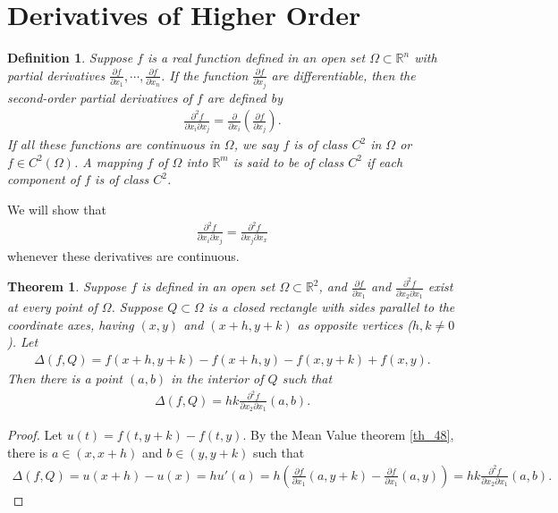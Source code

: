 \documentclass[11pt]{book}
\newtheorem{definition}{Definition}[chapter]
\newtheorem{theorem}{Theorem}[chapter]
\theoremstyle{definition}
\numberwithin{equation}{chapter}
\begin{document}
\medskip


\section{Derivatives of Higher Order}

\begin{definition}
Suppose $f$ is a real function defined in an open set $\Omega \subset \mathbb{R}^n$ with partial derivatives $\frac{\partial f}{\partial x_1}, \cdots, \frac{\partial f}{\partial x_n}$. If the function $\frac{\partial f}{\partial x_j}$ are differentiable, then  the second-order partial derivatives of $f$ are defined by
\begin{align*}
    \frac{\partial^2 f}{\partial x_i \partial x_j} = \frac{\partial}{\partial x_i} \left(\frac{\partial f}{\partial x_j}\right).
\end{align*}
If all these functions are continuous in $\Omega$, we say $f$ is of class $C^2$ in $\Omega$ or $f \in C^2(\Omega)$. A mapping $f$ of $\Omega$ into $\mathbb{R}^m$ is said to be of class $C^2$ if each component of $f$ is of class $C^2$.
\end{definition}

\medskip

We will show that
\begin{align*}
    \frac{\partial^2 f}{\partial x_i \partial x_j} = \frac{\partial^2 f}{\partial x_j \partial x_x}
\end{align*}
whenever these derivatives are continuous.

\medskip

\begin{theorem}\label{th_715}
Suppose $f$ is defined in an open set $\Omega \subset \mathbb{R}^2$, and $\frac{\partial f}{\partial x_1}$ and $\frac{\partial^2 f}{\partial x_2 \partial x_1}$ exist at every point of $\Omega$. Suppose $Q \subset \Omega$ is a closed rectangle with sides parallel to the coordinate axes, having $(x,y)$ and $(x+h,y+k)$ as opposite vertices ($h,k \neq 0$). Let
\begin{align*}
    \Delta (f,Q) = f(x+h,y+k) - f(x+h,y) - f(x,y+k) + f(x,y).
\end{align*}
Then there is a point $(a,b)$ in the interior of $Q$ such that
\begin{align}\label{th_715_equ1}
    \Delta (f,Q) = hk \frac{\partial^2 f}{\partial x_2 \partial x_1}(a,b).
\end{align}
\end{theorem}
\begin{proof}
Let $u(t) = f(t,y+k) - f(t,y)$. By the Mean Value theorem \ref{th_48}, there is $a \in (x,x+h)$ and $b \in (y,y+k)$ such that
\begin{align*}
    \Delta (f,Q) = u(x+h) - u(x) = h u'(a)  = h \left(\frac{\partial f}{\partial x_1}(a,y+k) - \frac{\partial f}{\partial x_1}(a,y)\right) = hk \frac{\partial^2 f}{\partial x_2 \partial x_1}(a,b).
\end{align*}
\end{proof}
\end{document}
